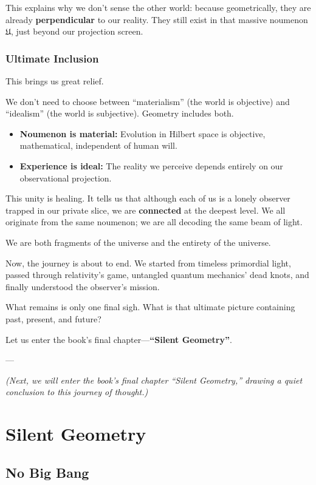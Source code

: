 \documentclass[11pt,a4paper,twoside]{book}
\begin{document}
This explains why we don't sense the other world: because geometrically, they are already \textbf{perpendicular} to our reality. They still exist in that massive noumenon $\mathfrak U$, just beyond our projection screen.

\subsection{Ultimate Inclusion}

This brings us great relief.

We don't need to choose between ``materialism'' (the world is objective) and ``idealism'' (the world is subjective). Geometry includes both.

\begin{itemize}
\item \textbf{Noumenon is material:} Evolution in Hilbert space is objective, mathematical, independent of human will.

\item \textbf{Experience is ideal:} The reality we perceive depends entirely on our observational projection.
\end{itemize}

This unity is healing. It tells us that although each of us is a lonely observer trapped in our private slice, we are \textbf{connected} at the deepest level. We all originate from the same noumenon; we are all decoding the same beam of light.

We are both fragments of the universe and the entirety of the universe.

Now, the journey is about to end. We started from timeless primordial light, passed through relativity's game, untangled quantum mechanics' dead knots, and finally understood the observer's mission.

What remains is only one final sigh. What is that ultimate picture containing past, present, and future?

Let us enter the book's final chapter---\textbf{``Silent Geometry''}.

---

\textit{(Next, we will enter the book's final chapter ``Silent Geometry,'' drawing a quiet conclusion to this journey of thought.)}

 
\chapter{Silent Geometry}

\section{No Big Bang}
\end{document}
